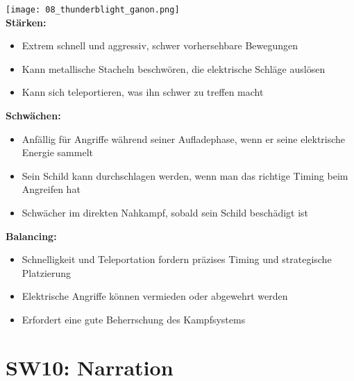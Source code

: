 \documentclass{article}
\begin{document}
\texttt{[image: 08\_thunderblight\_ganon.png]}
\\
\textbf{Stärken:}
\begin{itemize}
    \item Extrem schnell und aggressiv, schwer vorhersehbare Bewegungen
    \item Kann metallische Stacheln beschwören, die elektrische Schläge auslösen
    \item Kann sich teleportieren, was ihn schwer zu treffen macht
\end{itemize}
\bigskip
\textbf{Schwächen:}
\begin{itemize}
    \item Anfällig für Angriffe während seiner Aufladephase, wenn er seine elektrische Energie sammelt
    \item Sein Schild kann durchschlagen werden, wenn man das richtige Timing beim Angreifen hat
    \item Schwächer im direkten Nahkampf, sobald sein Schild beschädigt ist
\end{itemize}
\bigskip
\textbf{Balancing:}
\begin{itemize}
    \item Schnelligkeit und Teleportation fordern präzises Timing und strategische Platzierung
    \item Elektrische Angriffe können vermieden oder abgewehrt werden
    \item Erfordert eine gute Beherrschung des Kampfsystems
\end{itemize}

\section{SW10: Narration}
\end{document}
